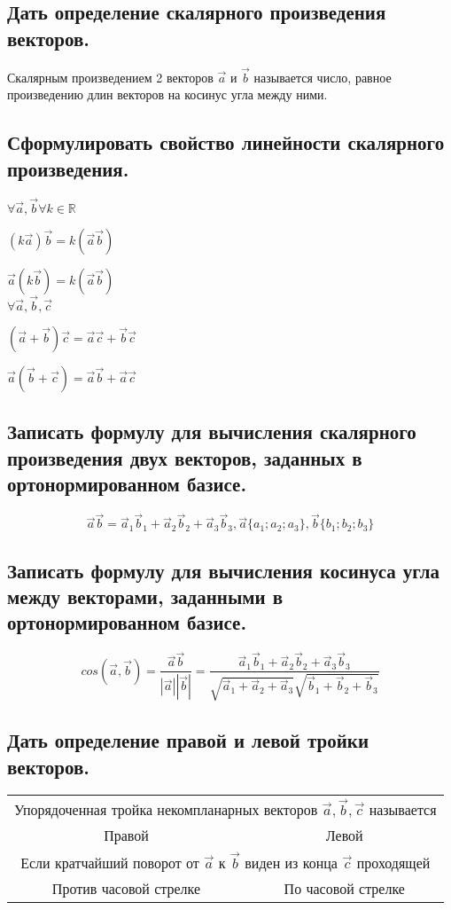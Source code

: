 \documentclass[a4paper, 10pt]{article}
\newcommand{\mcol}[1]{\multicolumn{2}{c}{#1}}
\renewcommand{\a}{\vec{a}}
\renewcommand{\b}{\vec{b}}
\renewcommand{\c}{\vec{c}}
\begin{document}
\subsection{Дать определение скалярного произведения векторов.}

Скалярным произведением 2 векторов $\a$ и $\b$ называется число, равное произведению длин
векторов на косинус угла между ними.

\subsection{Сформулировать свойство линейности скалярного произведения.}

\begin{center}
$\forall \a, \b \forall k \in \mathbb{R}$

$(k\a)\b = k(\a\b)$

$\a(k\b) = k(\a\b)$\\

$\forall \a, \b, \c$

$(\a + \b)\c = \a\c + \b\c$

$\a(\b + \c) = \a\b + \a\c$
\end{center}

\subsection{Записать формулу для вычисления скалярного произведения двух векторов, заданных в ортонормированном базисе.}

$$\a\b = \a_1\b_1 + \a_2\b_2 + \a_3\b_3,
\a\{a_1;a_2;a_3\},\b\{b_1;b_2;b_3\} $$

\subsection{Записать формулу для вычисления косинуса угла между векторами, заданными в ортонормированном базисе.}

$$cos(\a,\b) = \frac{ \a \b }{ |\a| |\b| } = 
\frac{\a_1\b_1 + \a_2\b_2 + \a_3\b_3}
{\sqrt{\a_1 + \a_2 + \a_3}\sqrt{\b_1+\b_2+\b_3}}$$

\subsection{Дать определение правой и левой тройки векторов.}

\begin{center}
\begin{tabular}{c c} 

    \mcol{Упорядоченная тройка некомпланарных векторов $\a, \b, \c$ называется }\\
    Правой & Левой \\
    \mcol{Если кратчайший поворот от $\a$ к $\b$ виден из конца $\c$ проходящей}\\
    Против часовой стрелке & По часовой стрелке\\

\end{tabular}
\end{center}
\end{document}

